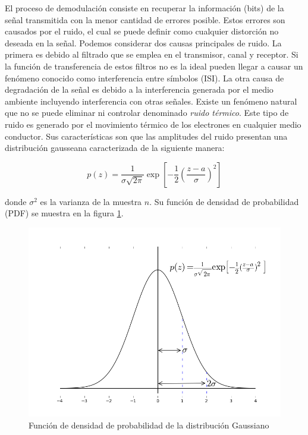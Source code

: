 El proceso de demodulaci\'on consiste en recuperar la informaci\'on (bits) de la se\~nal
transmitida con la menor cantidad de errores posible. Estos errores son causados por el ruido, el
cual se puede definir como cualquier distorci\'on no deseada en la se\~nal. Podemos considerar dos
causas principales de ruido. La primera es debido al filtrado que se emplea en el transmisor, canal
y receptor. Si la funci\'on de transferencia de estos filtros no es la ideal pueden llegar a causar
un fen\'omeno conocido como interferencia entre s\'imbolos (ISI). La otra causa de degradaci\'on de
la se\~nal es debido a la interferencia generada por el medio ambiente incluyendo interferencia con
otras se\~nales. Existe un fen\'omeno natural que no se puede eliminar ni controlar denominado
\emph{ruido t\'ermico}. Este tipo de ruido es generado por el movimiento t\'ermico de los electrones
en cualquier medio conductor. Sus caracter\'isticas son que las amplitudes del ruido presentan una
distribuci\'on gausseana caracterizada de la siguiente manera:

\begin{equation}\label{eq:gauss}
p(z)=\frac{1}{\sigma\sqrt{2\pi}}\exp\left[-\frac{1}{2}\left(\frac{z-a}{\sigma}\right)^2\right]
\end{equation}

donde $\sigma^2$ es la varianza de la muestra $n$. Su funci\'on de densidad de probabilidad (PDF) se
muestra en la figura \ref{fig:gauss}.

\begin{figure}[ht]
\centering
	\includegraphics[width=5.5in]{figs/gauss}
	\caption{Funci\'on de densidad de probabilidad de la distribuci\'on Gaussiano}
	\label{fig:gauss}
\end{figure}

